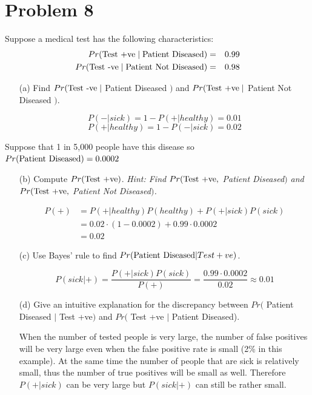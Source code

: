 \documentclass{article}
\newcommand{\1}{\mathbf{1}}
\begin{document}
\newpage
\section*{Problem 8} Suppose a medical test has the following characteristics:
\begin{eqnarray*}
    Pr(\hbox{Test +ve} \mid \hbox{Patient Diseased})&=& 0.99\\
    Pr(\hbox{Test -ve} \mid \hbox{Patient Not Diseased})&=& 0.98
\end{eqnarray*}

\begin{enumerate}
    \item[(a)] Find $Pr(\hbox{Test -ve} \mid $ Patient Diseased $)$ and $Pr(\hbox{Test +ve} \mid$ Patient Not Diseased $)$.
    
    $$P(-|sick) = 1 - P(+|healthy) = 0.01$$
    $$P(+|healthy) = 1 - P(-|sick) = 0.02$$
    
\end{enumerate}

Suppose that 1 in 5,000 people have this disease so $Pr(\hbox{Patient Diseased}) = 0.0002$
\begin{enumerate}
    \item[(b)] Compute $Pr( \hbox{Test +ve} )$. {\it Hint: Find $Pr(\hbox{Test +ve},$ {Patient Diseased}$)$ and $Pr(\hbox{Test +ve},$ {Patient Not Diseased}$)$.}
    
    \begin{align*}
        P(+) &= P(+|healthy) P(healthy) + P(+|sick)P(sick) \\
        &= 0.02\cdot (1-0.0002) + 0.99\cdot 0.0002 \\
        &= 0.02
    \end{align*}
    
    \item[(c)] Use Bayes' rule to find $Pr(\hbox{Patient Diseased} | {Test +ve})$.
    
    $$P(sick|+) = \frac{P(+|sick)P(sick)}{P(+)} = \frac{0.99\cdot 0.0002}{0.02} \approx 0.01$$

    \item[(d)] Give an intuitive explanation for the discrepancy between $Pr($ Patient Diseased $|$ {Test +ve}$)$ and $Pr($ {Test +ve} $|$ Patient Diseased).
    
    When the number of tested people is very large, the number of false positives will be very large even when the false positive rate is small (2\% in this example). At the same time the number of people that are sick is relatively small, thus the number of true positives will be small as well. Therefore $P(+|sick)$ can be very large but $P(sick|+)$ can still be rather small. 
    
    
\end{enumerate}
\end{document}
